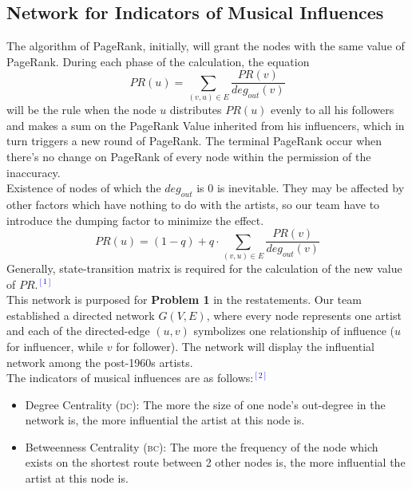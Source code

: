 \documentclass[12pt]{article}
\begin{document}
\subsection{Network for Indicators of Musical Influences}
The algorithm of PageRank, initially, will grant the nodes with the same value of PageRank. During each phase of the calculation, the equation
\begin{equation*}
PR(u)=\sum_{(v,u)\in E}\frac{PR(v)}{deg_{out}(v)}
\end{equation*}
will be the rule when the node $u$ distributes $PR(u)$ evenly to all his followers and makes a sum on the PageRank Value inherited from his influencers, which in turn triggers a new round of PageRank. The terminal PageRank occur when there's no change on PageRank of every node within the permission of the inaccuracy.\\[2ex]
Existence of nodes of which the $deg_{out}$ is 0 is inevitable. They may be affected by other factors which have nothing to do with the artists, so our team have to introduce the dumping factor to minimize the effect.\\[2ex]
$$PR(u)=(1-q)+q\cdot\sum_{(v,u)\in E} \frac{PR(v)}{deg_{out}(v)}$$
Generally, state-transition matrix is required for the calculation of the new value of $PR$.\textcolor{blue}{$^{[1]}$}\\[2ex]
This network is purposed for \textbf{Problem 1} in the restatements. Our team established a directed network $G(V,E)$, where every node represents one artist and each of the directed-edge $(u,v)$ symbolizes one relationship of influence ($u$ for influencer, while $v$ for follower). The network will display the influential network among the post-1960s artists.\\[2ex]
The indicators of musical influences are as follows:\textcolor{blue}{$^{[2]}$}
\begin{itemize}
	\item Degree Centrality ({\textsc{dc}}): The more the size of one node's out-degree in the network is, the more influential the artist at this node is.
	\item Betweenness Centrality ({\textsc{bc}}): The more the frequency of the node which exists on the shortest route between 2 other nodes is, the more influential the artist at this node is.
\end{itemize}
\end{document}
